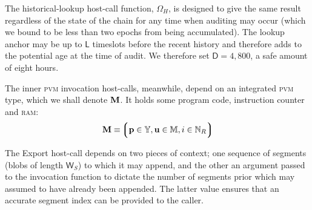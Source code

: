 The historical-lookup host-call function, $\Omega_H$, is designed to give the same result regardless of the state of the chain for any time when auditing may occur (which we bound to be less than two epochs from being accumulated). The lookup anchor may be up to $\mathsf{L}$ timeslots before the recent history and therefore adds to the potential age at the time of audit. We therefore set $\mathsf{D} = 4,800$, a safe amount of eight hours.

The inner \textsc{pvm} invocation host-calls, meanwhile, depend on an integrated \textsc{pvm} type, which we shall denote $\mathbf{M}$. It holds some program code, instruction counter and \textsc{ram}:
\begin{equation}
  \pvm \equiv \tuple{\isa{\mathbf{p}}{\Y}, \isa{\mathbf{u}}{\ram}, \isa{i}{\N_R}}
\end{equation}

The Export host-call depends on two pieces of context; one sequence of segments (blobs of length $\mathsf{W}_S$) to which it may append, and the other an argument passed to the invocation function to dictate the number of segments prior which may assumed to have already been appended. The latter value ensures that an accurate segment index can be provided to the caller.

